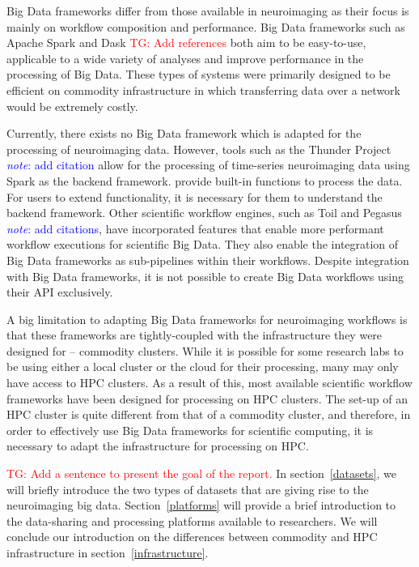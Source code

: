 \documentclass{report}
\newcommand{\note}[1]{\textcolor{blue}{\textit{note}: #1}}
\newcommand{\tristan}[1]{\textcolor{red}{TG: #1}}
\newcommand{\weird}[1]{\uwave{#1}}
\begin{document}
        Big Data frameworks differ from those available in neuroimaging as their
        focus is mainly on workflow composition and performance. Big Data 
        frameworks such as Apache Spark and Dask \tristan{Add references} both aim to be easy-to-use,
        applicable to a wide variety of analyses and improve performance in the 
        processing of Big Data. These types of systems were primarily designed 
        to be efficient on commodity infrastructure in which transferring data
        over a network would be extremely costly.

        Currently, there exists no Big Data framework which is adapted for the
        processing of neuroimaging data. However, tools such as the Thunder 
        Project \note{add citation} allow for the processing of time-series
        neuroimaging data using Spark as the backend framework. \weird{Tools such as 
        these} provide built-in functions to process the data. For users to 
        extend functionality, it is necessary for them to understand the backend
        framework. Other scientific workflow engines, such as Toil and Pegasus
        \note{add citations}, have incorporated features that enable more 
        performant workflow executions for scientific Big Data. They also enable
        the integration of Big Data frameworks as sub-pipelines within their 
        workflows. Despite integration with Big Data frameworks, it is not
        possible to create Big Data workflows using their API exclusively.

        A big limitation to adapting Big Data frameworks for neuroimaging 
        workflows is that these frameworks are tightly-coupled with the 
        infrastructure they were designed for -- commodity clusters. While
        it is possible for some research labs to be using either a local cluster
        or the cloud for their processing, many may only have access to HPC
        clusters. As a result of this, most available scientific workflow 
        frameworks have been designed for processing on HPC clusters. The 
        set-up of an HPC cluster is quite different from that of a commodity 
        cluster, and therefore, in order to effectively use Big Data frameworks
        for scientific computing, it is necessary to adapt the infrastructure 
        for processing on HPC.

        \tristan{Add a sentence to present the goal of the report.}
        In section~\ref{datasets}, we will briefly introduce the two 
        types of datasets that are giving rise to the neuroimaging big 
        data. Section~\ref{platforms} will provide a brief introduction 
        to the data-sharing and processing platforms available to 
        researchers. We will conclude our 
        introduction on the differences between commodity and HPC infrastructure
        in section~\ref{infrastructure}.
\end{document}
